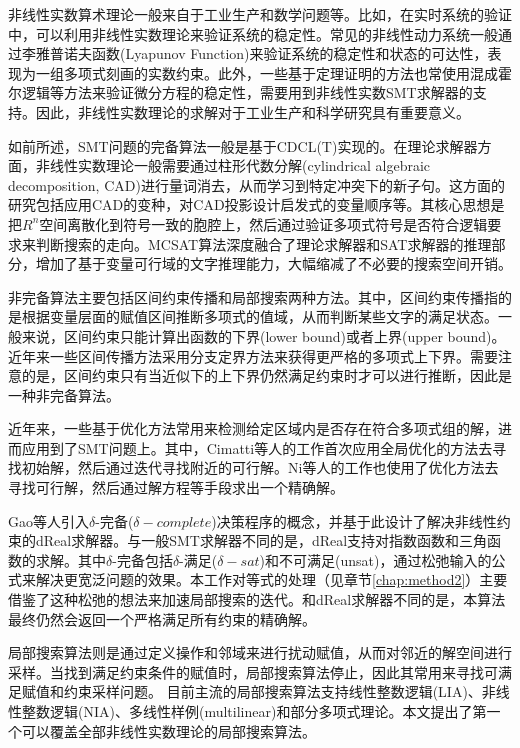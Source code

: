 非线性实数算术理论一般来自于工业生产和数学问题等。比如，在实时系统的验证中，可以利用非线性实数理论来验证系统的稳定性\cite{CPS1,CPS2,CPS3}。常见的非线性动力系统一般通过李雅普诺夫函数(Lyapunov Function)来验证系统的稳定性和状态的可达性，表现为一组多项式刻画的实数约束。此外，一些基于定理证明的方法也常使用混成霍尔逻辑等方法来验证微分方程的稳定性，需要用到非线性实数SMT求解器的支持。因此，非线性实数理论的求解对于工业生产和科学研究具有重要意义。

如前所述，SMT问题的完备算法一般是基于CDCL(T)实现的。在理论求解器方面，非线性实数理论一般需要通过柱形代数分解(cylindrical algebraic decomposition, CAD)\cite{Caviness2004QuantifierEA}进行量词消去，从而学习到特定冲突下的新子句。这方面的研究包括应用CAD的变种\cite{AbrahamDEK21}，对CAD投影设计启发式的变量顺序\cite{LiXZZ23}等。其核心思想是把$R^n$空间离散化到符号一致的胞腔上，然后通过验证多项式符号是否符合逻辑要求来判断搜索的走向。MCSAT算法深度融合了理论求解器和SAT求解器的推理部分，增加了基于变量可行域的文字推理能力，大幅缩减了不必要的搜索空间开销。

非完备算法主要包括区间约束传播和局部搜索两种方法。其中，区间约束传播指的是根据变量层面的赋值区间推断多项式的值域，从而判断某些文字的满足状态。一般来说，区间约束只能计算出函数的下界(lower bound)或者上界(upper bound)。近年来一些区间传播方法采用分支定界方法来获得更严格的多项式上下界。需要注意的是，区间约束只有当近似下的上下界仍然满足约束时才可以进行推断，因此是一种非完备算法。

近年来，一些基于优化方法常用来检测给定区域内是否存在符合多项式组的解，进而应用到了SMT问题上。其中，Cimatti等人的工作\cite{CimattiGLS22}首次应用全局优化的方法去寻找初始解，然后通过迭代寻找附近的可行解。Ni等人的工作也使用了优化方法去寻找可行解\cite{NiWX23}，然后通过解方程\cite{LiXZ23b}等手段求出一个精确解。

Gao等人引入$\delta$-完备($\delta-complete$)决策程序的概念\cite{GaoKC13}，并基于此设计了解决非线性约束的dReal求解器。与一般SMT求解器不同的是，dReal支持对指数函数和三角函数的求解。其中$\delta$-完备包括$\delta$-满足($\delta-sat$)和不可满足(unsat)，通过松弛输入的公式来解决更宽泛问题的效果。本工作对等式的处理（见章节\ref{chap:method2}）主要借鉴了这种松弛的想法来加速局部搜索的迭代。和dReal求解器不同的是，本算法最终仍然会返回一个严格满足所有约束的精确解。

局部搜索算法则是通过定义操作和邻域来进行扰动赋值，从而对邻近的解空间进行采样。当找到满足约束条件的赋值时，局部搜索算法停止，因此其常用来寻找可满足赋值和约束采样问题。
目前主流的局部搜索算法支持线性整数逻辑(LIA)\cite{CaiLZ22}、非线性整数逻辑(NIA)\cite{CaiLZ2023}、多线性样例(multilinear)\cite{multilinear}和部分多项式理论\cite{LiXZ23}。本文提出了第一个可以覆盖全部非线性实数理论的局部搜索算法。

